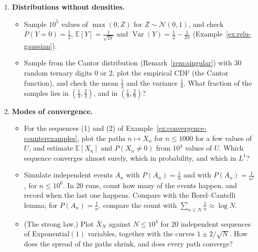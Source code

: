 \documentclass[11pt]{article}
\newcommand{\E}{\mathbb{E}}
\DeclareMathOperator{\Var}{Var}
\theoremstyle{definition}
\theoremstyle{plain}
\theoremstyle{remark}
\begin{document}
\begin{enumerate}[label=\textbf{P\arabic*.}, leftmargin=*]
    \item \textbf{Distributions without densities.}
    \begin{itemize}
        \item Sample $10^5$ values of $\max(0, Z)$ for $Z \sim \mathcal{N}(0, 1)$, and check $P(Y = 0) = \frac{1}{2}$, $\E[Y] = \frac{1}{\sqrt{2\pi}}$ and $\Var(Y) = \frac{1}{2} - \frac{1}{2\pi}$ (Example~\ref{ex:relu-gaussian}).
        \item Sample from the Cantor distribution (Remark~\ref{rem:singular}) with $30$ random ternary digits $0$ or $2$, plot the empirical CDF (the Cantor function), and check the mean $\frac{1}{2}$ and the variance $\frac{1}{8}$. What fraction of the samples lies in $(\frac{1}{3}, \frac{2}{3})$, and in $(\frac{1}{9}, \frac{2}{9})$?
    \end{itemize}

    \item \textbf{Modes of convergence.}
    \begin{itemize}
        \item For the sequences (1) and (2) of Example~\ref{ex:convergence-counterexamples}, plot the paths $n \mapsto X_n$ for $n \leq 1000$ for a few values of $U$, and estimate $\E[X_n]$ and $P(X_n \neq 0)$ from $10^4$ values of $U$. Which sequence converges almost surely, which in probability, and which in $L^1$?
        \item Simulate independent events $A_n$ with $P(A_n) = \frac{1}{n}$ and with $P(A_n) = \frac{1}{n^2}$, for $n \leq 10^6$. In $20$ runs, count how many of the events happen, and record when the last one happens. Compare with the Borel--Cantelli lemma; for $P(A_n) = \frac{1}{n}$, compare the count with $\sum_{n \leq N}\frac{1}{n} \approx \log N$.
        \item (The strong law.) Plot $\bar X_N$ against $N \leq 10^4$ for $20$ independent sequences of Exponential$(1)$ variables, together with the curves $1 \pm 2/\sqrt{N}$. How does the spread of the paths shrink, and does every path converge?
    \end{itemize}


\end{enumerate}
\end{document}
